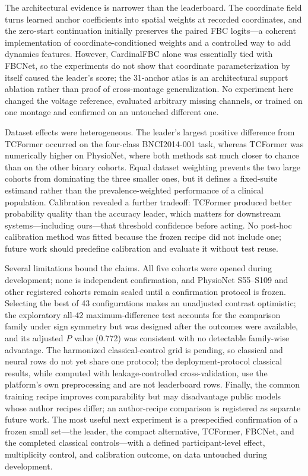 \documentclass[journal,twoside,web]{template/ieeecolor2-tectonic}
\begin{document}
The architectural evidence is narrower than the leaderboard. The coordinate field turns learned anchor coefficients into spatial weights at recorded coordinates, and the zero-start continuation initially preserves the paired FBC logits---a coherent implementation of coordinate-conditioned weights and a controlled way to add dynamics features. However, CardinalFBC alone was essentially tied with FBCNet, so the experiments do not show that coordinate parameterization by itself caused the leader's score; the 31-anchor atlas is an architectural support ablation rather than proof of cross-montage generalization. No experiment here changed the voltage reference, evaluated arbitrary missing channels, or trained on one montage and confirmed on an untouched different one.

Dataset effects were heterogeneous. The leader's largest positive difference from TCFormer occurred on the four-class BNCI2014-001 task, whereas TCFormer was numerically higher on PhysioNet, where both methods sat much closer to chance than on the other binary cohorts. Equal dataset weighting prevents the two large cohorts from dominating the three smaller ones, but it defines a fixed-suite estimand rather than the prevalence-weighted performance of a clinical population. Calibration revealed a further tradeoff: TCFormer produced better probability quality than the accuracy leader, which matters for downstream systems---including ours---that threshold confidence before acting. No post-hoc calibration method was fitted because the frozen recipe did not include one; future work should predefine calibration and evaluate it without test reuse.

Several limitations bound the claims. All five cohorts were opened during development; none is independent confirmation, and PhysioNet S55--S109 and other registered cohorts remain sealed until a confirmation protocol is frozen. Selecting the best of 43 configurations makes an unadjusted contrast optimistic; the exploratory all-42 maximum-difference test accounts for the comparison family under sign symmetry but was designed after the outcomes were available, and its adjusted $P$ value (0.772) was consistent with no detectable family-wise advantage. The harmonized classical-control grid is pending, so classical and neural rows do not yet share one protocol; the deployment-protocol classical results, while computed with leakage-controlled cross-validation, use the platform's own preprocessing and are not leaderboard rows. Finally, the common training recipe improves comparability but may disadvantage public models whose author recipes differ; an author-recipe comparison is registered as separate future work. The most useful next experiment is a prespecified confirmation of a frozen small set---the leader, the compact alternative, TCFormer, FBCNet, and the completed classical controls---with a defined participant-level effect, multiplicity control, and calibration outcome, on data untouched during development.
\end{document}
